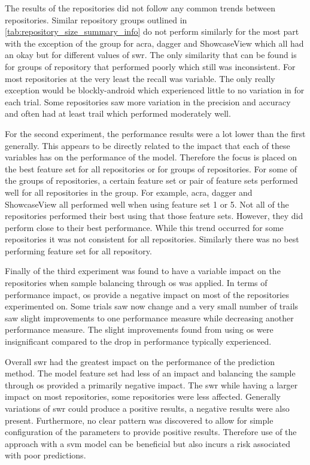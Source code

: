 The results of the repositories did not follow any common trends between repositories. Similar repository groups outlined in \autoref{tab:repository_size_summary_info} do not perform similarly for the most part with the exception of the group for acra, dagger and ShowcaseView which all had an okay but for different values of \gls{swr}. The only similarity that can be found is for groups of repository that performed poorly which still was inconsistent. For most repositories at the very least the recall was variable. The only really exception would be blockly-android which experienced little to no variation in for each trial. Some repositories saw more variation in the precision and accuracy and often had at least trail which performed moderately well.

For the second experiment, the performance results were a lot lower than the first generally. This appears to be directly related to the impact that each of these variables has on the performance of the model. Therefore the focus is placed on the best feature set for all repositories or for groups of repositories. For some of the groups of repositories, a certain feature set or pair of feature sets performed well for all repositories in the group. For example, acra, dagger and ShowcaseView all performed well when using feature set 1 or 5. Not all of the repositories performed their best using that those feature sets. However, they did perform close to their best performance. While this trend occurred for some repositories it was not consistent for all repositories. Similarly there was no best performing feature set for all repository.

Finally of the third experiment was found to have a variable impact on the repositories when sample balancing through \gls{os} was applied. In terms of performance impact, \gls{os} provide a negative impact on most of the repositories experimented on. Some trials saw now change and a very small number of trails saw slight improvements to one performance measure while decreasing another performance measure. The slight improvements found from using \gls{os} were insignificant compared to the drop in performance typically experienced.

Overall \gls{swr} had the greatest impact on the performance of the prediction method. The model feature set had less of an impact and balancing the sample through \gls{os} provided a primarily negative impact. The \gls{swr} while having a larger impact on most repositories, some repositories were less affected. Generally variations of \gls{swr} could produce a positive results, a negative results were also present. Furthermore, no clear pattern was discovered to allow for simple configuration of the parameters to provide positive results. Therefore use of the approach with a \gls{svm} model can be beneficial but also incurs a risk associated with poor predictions.

